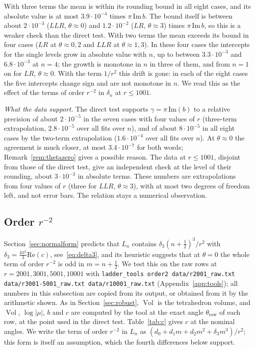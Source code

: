 \documentclass[11pt]{amsart}
\theoremstyle{definition}
\theoremstyle{remark}
\newcommand{\Vol}{\operatorname{Vol}}
\begin{document}
With three terms the mean is within its rounding bound in all eight cases, and its
absolute value is at most $3.9\cdot10^{-4}$ times $\pi\,\mathrm{Im}\,b$. The bound
itself is between about $2\cdot10^{-3}$ ($LLR$, $\theta \approx 0$) and
$1.2\cdot10^{-2}$ ($LR$, $\theta \approx 3$) times $\pi\,\mathrm{Im}\,b$, so this is a
weaker check than the direct test. With two terms the mean exceeds its bound in four
cases ($LR$ at $\theta \approx 0, 2$ and $LLR$ at $\theta \approx 1, 3$). In these four
cases the intercepts for the single levels grow in absolute value with $n$, up to
between $3.3\cdot10^{-3}$ and $6.8\cdot10^{-3}$ at $n = 4$; the growth is monotone in
$n$ in three of them, and from $n = 1$ on for $LR$, $\theta \approx 0$. With the term
$1/r^2$ this drift is gone: in each of the eight cases the five intercepts change sign
and are not monotone in $n$. We read this as the effect of the terms of order $r^{-2}$
in $\delta_n$ at $r \le 1001$.

\emph{What the data support.} The direct test supports $\gamma = \pi\,\mathrm{Im}(b)$
to a relative precision of about $2\cdot10^{-5}$ in the seven cases with four values of
$r$ (three-term extrapolation, $2.8\cdot10^{-5}$ over all fits over $n$), and of about
$8\cdot10^{-5}$ in all eight cases by the two-term extrapolation ($1.6\cdot10^{-4}$
over all fits over $n$). At $\theta \approx 0$ the agreement is much closer, at most
$3.4\cdot10^{-7}$ for both words; Remark~\ref{rem:thetazero} gives a possible reason.
The data at $r \le 1001$, disjoint from those of the direct test, give an independent
check at the level of their rounding, about $3\cdot10^{-3}$ in absolute terms. These
numbers are extrapolations from four values of $r$ (three for $LLR$,
$\theta \approx 3$), with at most two degrees of freedom left, and not error bars.
The relation stays a numerical observation.

\subsection{Order $r^{-2}$}\label{sec:order2}
Section~\ref{sec:normalform} predicts that $L_n$ contains $\delta_3(n+\frac12)^3/r^2$
with $\delta_3 = \frac{4\pi^2}{3}\mathrm{Re}(c)$, see~\eqref{eq:delta3}, and its
heuristic suggests that at $\theta = 0$ the whole term of order $r^{-2}$ is odd in
$m = n + \frac12$. We test this on the raw rows at $r = 2001, 3001, 5001, 10001$ with
\texttt{ladder\_tools order2 data/r2001\_raw.txt data/r3001-5001\_raw.txt
data/r10001\_raw.txt} (Appendix~\ref{app:tools}); all numbers in this subsection are
copied from its output, or obtained from it by the arithmetic shown. As in
Section~\ref{sec:robust}, $\Vol$ is the tetrahedron volume, and $\Vol$, $\log|\mu|$,
$b$ and $c$ are computed by the tool at the exact angle $\theta_{\mathrm{row}}$ of each
row, at the point used in the direct test. Table~\ref{tab:c} gives $c$
at the nominal angles. We write the term of order $r^{-2}$ in $L_n$ as
$(d_0 + d_1m + d_2m^2 + \delta_3m^3)/r^2$; this form is itself an assumption, which the
fourth differences below support.
\end{document}
